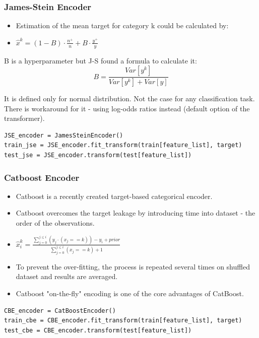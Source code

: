 \documentclass{beamer}
\begin{document}
    \begin{frame}[fragile]
        \frametitle{James-Stein Encoder}
        \begin{itemize}
            \item Estimation of the mean target for category k could be calculated by:
            \pause
            \item $\hat{x}^k = (1-B) \cdot \frac{n^+}{n} + B \cdot \frac{y^+}{y}$
            \pause
        \end{itemize}

        B is a hyperparameter but J-S found a formula to calculate it:
        \[
            B = \frac{Var[y^k]}{Var[y^k] + Var[y]}
        \]

        \pause
        It is defined only for normal distribution. Not the case for any classification task.
        There is workaround for it - using log-odds ratios instead (default option of the
        transformer).
        \begin{lstlisting}
JSE_encoder = JamesSteinEncoder()
train_jse = JSE_encoder.fit_transform(train[feature_list], target)
test_jse = JSE_encoder.transform(test[feature_list])
        \end{lstlisting}
    \end{frame}

    \begin{frame}[fragile]
        \frametitle{Catboost Encoder}
        \begin{itemize}
            \item Catboost is a recently created target-based categorical encoder.
            \pause
            \item Catboost overcomes the target leakage by introducing time into dataset - the
            order of the observations.
            \pause
            \item $\hat{x}^k_i = \frac{\sum_{j = 0}^{j \leq i} (y_j \cdot (x_j == k)) - y_i +
            prior}{\sum_{j = 0}^{j \leq i} (x_j == k) + 1}$
            \pause
            \item To prevent the over-fitting, the process is repeated several times on shuffled
            dataset and results are averaged.
            \pause
            \item Catboost "on-the-fly" encoding is one of the core advantages of CatBoost.
            \pause
        \end{itemize}

        \begin{lstlisting}
CBE_encoder = CatBoostEncoder()
train_cbe = CBE_encoder.fit_transform(train[feature_list], target)
test_cbe = CBE_encoder.transform(test[feature_list])
        \end{lstlisting}
    \end{frame}
\end{document}
